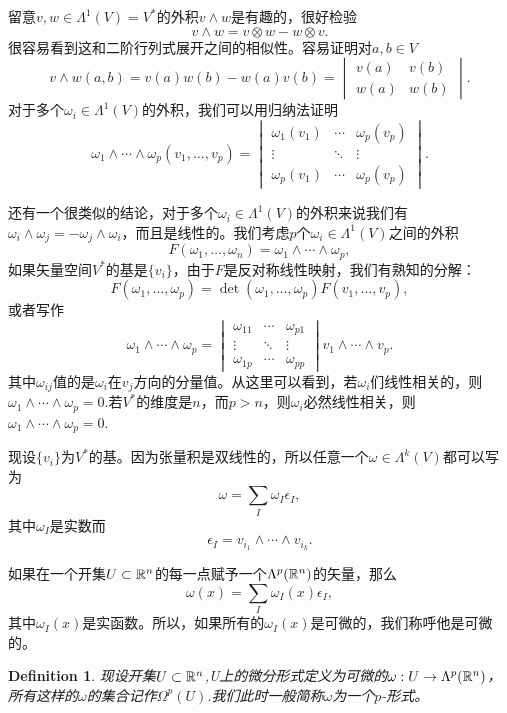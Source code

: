 \documentclass[11pt]{extbook}
\theoremstyle{plain}%
\newtheorem{defi}{Definition}[section]%
\begin{document}
留意$v,w\in \Lambda^1(V)=V^*$的外积$v\wedge w$是有趣的，很好检验
\[
	v\wedge w=v\otimes w- w\otimes v.
\]
很容易看到这和二阶行列式展开之间的相似性。容易证明对$a,b\in V$
\[
	v\wedge w(a,b)=v(a)w(b)- w(a)v(b)=\begin{vmatrix}v(a)&v(b)\\w(a)&w(b)\end{vmatrix}.
\]
对于多个$\omega_i \in \Lambda^1(V)$的外积，我们可以用归纳法证明
\[
	\omega_1\wedge \cdots \wedge\omega_p(v_1,\dots,v_p)=
	\begin{vmatrix}
		\omega_1(v_1)&\cdots&\omega_p(v_p)\\
		\vdots&\ddots&\vdots\\
		\omega_p(v_1)&\cdots&\omega_p(v_p)
	\end{vmatrix}.
\]

还有一个很类似的结论，对于多个$\omega_i \in \Lambda^1(V)$的外积来说我们有$\omega_i \wedge \omega_j=-\omega_j \wedge \omega_i$，而且是线性的。我们考虑$p$个$\omega_i \in \Lambda^1(V)$之间的外积
\[
	F(\omega_1, \dots,\omega_n)=\omega_1\wedge \cdots \wedge \omega_p,
\]
如果矢量空间$V^*$的基是$\{v_i\}$，由于$F$是反对称线性映射，我们有熟知的分解：
\[
	F(\omega_1, \dots,\omega_p)=\det(\omega_1, \dots,\omega_p)F(v_1, \dots,v_p),
\]
或者写作
\[
	\omega_1\wedge \cdots \wedge \omega_p=
	\begin{vmatrix}
		\omega_{11}&\cdots&\omega_{p1}\\
		\vdots&\ddots&\vdots\\
		\omega_{1p}&\cdots&\omega_{pp}
	\end{vmatrix}
	v_1\wedge \cdots \wedge v_p.
\]
其中$\omega_{ij}$值的是$\omega_i$在$v_j$方向的分量值。从这里可以看到，若$\omega_i$们线性相关的，则$\omega_1\wedge \cdots \wedge \omega_p=0$.若$V^*$的维度是$n$，而$p>n$，则$\omega_i$必然线性相关，则$\omega_1\wedge \cdots \wedge \omega_p=0$.

现设$\{v_i\}$为$V^*$的基。因为张量积是双线性的，所以任意一个$\omega \in \Lambda^k(V)$都可以写为
\[
\omega=\sum_I\omega_I \epsilon_I,
\]
其中$\omega_I $是实数而
\[
\epsilon_I=v_{i_1}\wedge \cdots \wedge v_{i_k}.
\]

如果在一个开集$U\subset \mathbb{R}^n$的每一点赋予一个$\Lambda^p(\mathbb{R}^n)$的矢量，那么
\[
\omega(x)=\sum_I\omega_I(x) \epsilon_I,
\]
其中$\omega_I(x)$是实函数。所以，如果所有的$\omega_I(x)$是可微的，我们称呼他是可微的。
\begin{defi}
现设开集$U\subset \mathbb{R}^n$,U上的微分形式定义为可微的$\omega:U \to \Lambda^p(\mathbb{R}^n)$，所有这样的$\omega$的集合记作$\Omega^p(U)$.我们此时一般简称$\omega$为一个$p$-形式。
\end{defi}
\end{document}
